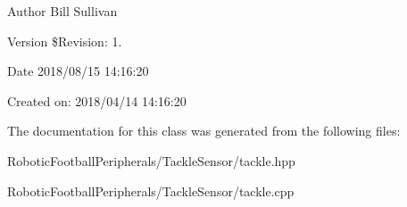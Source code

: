 \begin{DoxyAuthor}{Author}
Bill Sullivan
\end{DoxyAuthor}
\begin{DoxyVersion}{Version}
\$\+Revision\+: 1.
\end{DoxyVersion}
\begin{DoxyDate}{Date}
2018/08/15 14\+:16\+:20
\end{DoxyDate}
Created on\+: 2018/04/14 14\+:16\+:20 

The documentation for this class was generated from the following files\+:\begin{DoxyCompactItemize}
\item 
Robotic\+Football\+Peripherals/\+Tackle\+Sensor/tackle.\+hpp\item 
Robotic\+Football\+Peripherals/\+Tackle\+Sensor/tackle.\+cpp\end{DoxyCompactItemize}
